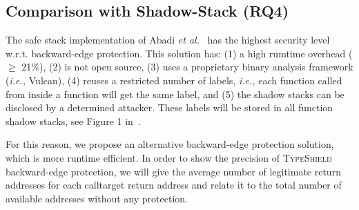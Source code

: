 % 


\subsection{Comparison with Shadow-Stack (RQ4)}
\label{RQ10: Comparison with SafeStack}

The safe stack implementation of Abadi \textit{et al.}~\cite{abadi:cfi2} has the highest
security level~\cite{cfi:survey} w.r.t. backward-edge protection. This solution has:
(1) a high rumtime overhead ($\ge$ 21\%), 
(2) is not open source, 
(3) uses a proprietary binary analysis framework (\textit{i.e.,} Vulcan), 
(4) reuses a restricted number of labels, \textit{i.e.,} each function called from inside a function will get the same label, and
(5) the shadow stacks can be disclosed by a determined attacker.
These labels will be stored in all function shadow stacks, see Figure 1 in~\cite{abadi:cfi2}. 

For this reason, we propose an alternative backward-edge protection solution, which is more runtime efficient.
In order to show the precision of \textsc{TypeShield} backward-edge protection, we will give the average number of legitimate return addresses for each calltarget return address 
and relate it to the total number of available addresses without any protection.

